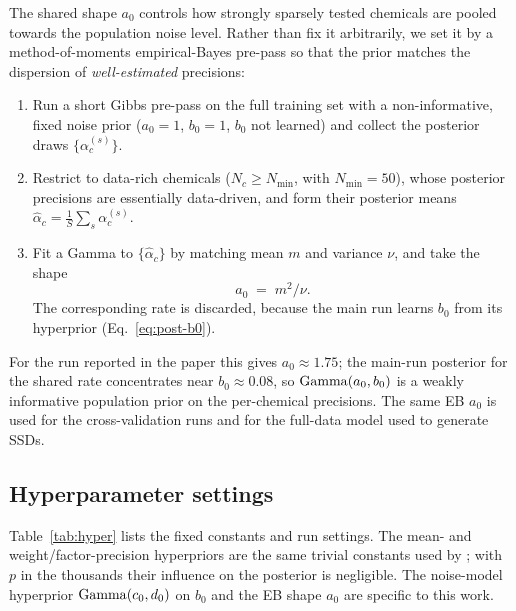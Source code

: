 The shared shape $a_0$ controls how strongly sparsely tested chemicals are
pooled towards the population noise level. Rather than fix it arbitrarily, we set
it by a method-of-moments empirical-Bayes pre-pass so that the prior matches the
dispersion of \emph{well-estimated} precisions:
\begin{enumerate}
  \item Run a short Gibbs pre-pass on the full training set with a non-informative,
  fixed noise prior ($a_0=1$, $b_0=1$, $b_0$ not learned) and collect the
  posterior draws $\{\alpha_c^{(s)}\}$.
  \item Restrict to data-rich chemicals ($N_c\ge N_{\min}$, with $N_{\min}=50$),
  whose posterior precisions are essentially data-driven, and form their
  posterior means $\hat{\alpha}_c=\tfrac{1}{S}\sum_s\alpha_c^{(s)}$.
  \item Fit a Gamma to $\{\hat{\alpha}_c\}$ by matching mean $m$ and variance
  $\nu$, and take the shape
  \begin{equation}
    a_0 \;=\; m^2/\nu.
  \end{equation}
  The corresponding rate is discarded, because the main run learns $b_0$ from its
  hyperprior (Eq.~\ref{eq:post-b0}).
\end{enumerate}
For the run reported in the paper this gives $a_0\approx1.75$; the main-run
posterior for the shared rate concentrates near $b_0\approx0.08$, so
$\mathrm{Gamma}(a_0,b_0)$ is a weakly informative population prior on the per-chemical
precisions. The same EB $a_0$ is used for the cross-validation runs and for the
full-data model used to generate SSDs.

\subsection{Hyperparameter settings}
\label{sec:hyper}

Table~\ref{tab:hyper} lists the fixed constants and run settings. The mean- and
weight/factor-precision hyperpriors are the same trivial constants used by
\citet{rendle2011bayesian}; with $p$ in the thousands their influence on the
posterior is negligible. The noise-model hyperprior $\mathrm{Gamma}(c_0,d_0)$ on $b_0$ and
the EB shape $a_0$ are specific to this work.

